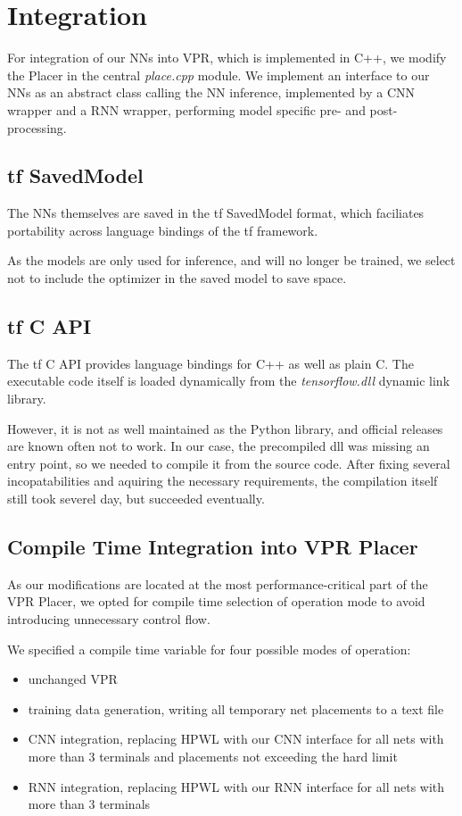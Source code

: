 \section{Integration}

For integration of our \glspl{NN} into \gls{VPR}, which is implemented in C++, we modify the Placer in the central \textit{place.cpp} module. We implement an interface to our \glspl{NN} as an abstract class calling the \gls{NN} inference, implemented by a \gls{CNN} wrapper and a \gls{RNN} wrapper, performing model specific pre- and post-processing.

\subsection{\gls{tf} SavedModel}

The \glspl{NN} themselves are saved in the \gls{tf} SavedModel format, which faciliates portability across language bindings of the \gls{tf} framework. 
	
As the models are only used for inference, and will no longer be trained, we select not to include the optimizer in the saved model to save space.

\subsection{\gls{tf} C API}

The \gls{tf} C API provides language bindings for C++ as well as plain C. The executable code itself is loaded dynamically from the \textit{tensorflow.dll} dynamic link library.

However, it is not as well maintained as the Python library, and official releases are known often not to work. In our case, the precompiled dll was missing an entry point, so we needed to compile it from the source code. After fixing several incopatabilities and aquiring the necessary requirements, the compilation itself still took severel day, but succeeded eventually.

\subsection{Compile Time Integration into \gls{VPR} Placer}

As our modifications are located at the most performance-critical part of the \gls{VPR} Placer, we opted for compile time selection of operation mode to avoid introducing unnecessary control flow. 

We specified a compile time variable for four possible modes of operation: 

\begin{itemize}
	\item unchanged \gls{VPR}
	\item training data generation, writing all temporary net placements to a text file
	\item \gls{CNN} integration, replacing \gls{HPWL} with our \gls{CNN} interface for all nets with more than 3 terminals and placements not exceeding the hard limit
	\item \gls{RNN} integration, replacing \gls{HPWL} with our \gls{RNN} interface for all nets with more than 3 terminals
\end{itemize}
